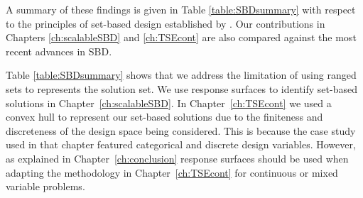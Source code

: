 A summary of these findings is given in Table \ref{table:SBDsummary} with respect to the principles of set-based design established by \citeauthor{SobekIi1999} \cite{SobekIi1999}. Our contributions in Chapters \ref{ch:scalableSBD} and \ref{ch:TSEcont} are also compared against the most recent advances in \ac{SBD}.

Table \ref{table:SBDsummary} shows that we address the limitation of using ranged sets to represents the solution set. We use response surfaces to identify set-based solutions in Chapter~\ref{ch:scalableSBD}. In Chapter~\ref{ch:TSEcont} we used a convex hull to represent our set-based solutions due to the finiteness and discreteness of the design space being considered. This is because the case study used in that chapter featured categorical and discrete design variables. However, as explained in Chapter~\ref{ch:conclusion} response surfaces should be used when adapting the methodology in Chapter~\ref{ch:TSEcont} for continuous or mixed variable problems.

\renewcommand{\changeCW}{0.55cm}
\renewcommand{\mycontCW}{1.2cm}

